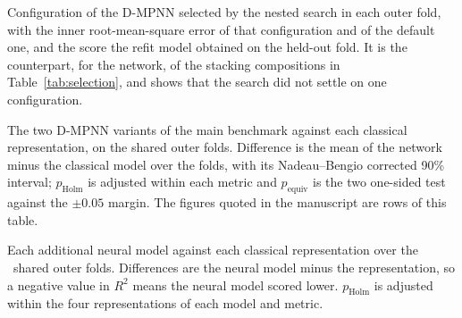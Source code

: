 \documentclass[a4paper,11pt]{article}
\begin{document}
\begin{table}[htbp]
	\centering
	\caption{Configuration of the D-MPNN selected by the nested search in each outer fold, with the inner
		root-mean-square error of that configuration and of the default one, and the score the refit model obtained on
		the held-out fold. It is the counterpart, for the network, of the stacking compositions in
		Table~\ref{tab:selection}, and shows that the search did not settle on one configuration.}
	\label{tab:gnn_tuned_config}
	\footnotesize
	
\end{table}

\begin{table}[htbp]
	\centering
	\caption{The two D-MPNN variants of the main benchmark against each classical representation, on the
		\TotalOuterFolds{} shared outer folds. Difference is the mean of the network minus the classical model over
		the folds, with its Nadeau--Bengio corrected 90\% interval; $p_{\mathrm{Holm}}$ is adjusted within each metric
		and $p_{\mathrm{equiv}}$ is the two one-sided test against the $\pm 0.05$ margin. The figures quoted in the
		manuscript are rows of this table.}
	\label{tab:gnn_pairwise}
	
\end{table}

\begin{table}[htbp]
	\centering
	\caption{Each additional neural model against each classical representation over the \TotalOuterFolds\ shared outer folds. Differences are the neural model minus the representation, so a negative value in $R^2$ means the neural model scored lower. $p_{\mathrm{Holm}}$ is adjusted within the four representations of each model and metric.}
	\label{tab:strong_pairwise}
	\scriptsize
	
\end{table}

\clearpage
\newcommand{\ScaffoldPairwiseCaption}{Comparisons under scaffold-grouped folds: every neural model against every classical representation, and the classical representations against each other. The unadjusted $p$ is given beside the adjusted one because the 90\% intervals quoted in the manuscript are not corrected for multiplicity, which is why an interval can exclude zero while the adjusted $p$ is far from significance.}

\end{document}
